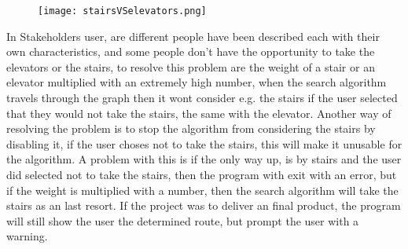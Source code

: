 \begin{figure}[ht!]
    \centering
    \texttt{[image: stairsVSelevators.png]}
    \label{fig:labeled_stairsVSelevators}
  \end{figure}


In Stakeholders user, are different people have been described each with their own characteristics, and some people don't have the opportunity to take the elevators or the stairs, to resolve this problem are the weight of a stair or an elevator multiplied with an extremely high number, when the search algorithm travels through the graph then it wont consider e.g. the stairs if the user selected that they would not take the stairs, the same with the elevator. Another way of resolving the problem is to stop the algorithm from considering the stairs by disabling it, if the user choses not to take the stairs, this will make it unusable for the algorithm. A problem with this is if the only way up, is by stairs and the user did selected not to take the stairs, then the program with exit with an error, but if the weight is multiplied with a number, then the search algorithm will take the stairs as an last resort. If the project was to deliver an final product, the program will still show the user the determined route, but prompt the user with a warning.



